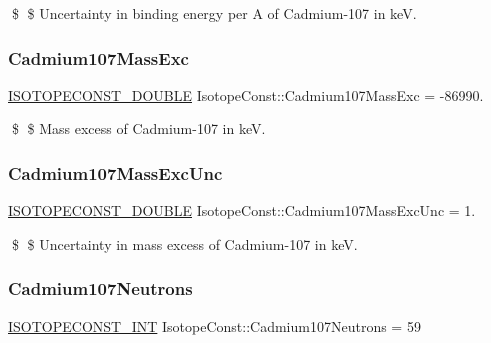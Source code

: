 \$ \$ Uncertainty in binding energy per A of Cadmium-\/107 in keV. \mbox{\label{group___isotope_const-_cadmium-_cd107_ga6fe8e1defdd8b0664dfb27195880ed9b}} 
\subsubsection{\texorpdfstring{Cadmium107\+Mass\+Exc}{Cadmium107MassExc}}
{\footnotesize\ttfamily \mbox{\hyperlink{group___isotope_const-_macros_ga8f45a7272ce02c0b4c65c44636ed719a}{I\+S\+O\+T\+O\+P\+E\+C\+O\+N\+S\+T\+\_\+\+D\+O\+U\+B\+LE}} Isotope\+Const\+::\+Cadmium107\+Mass\+Exc = -\/86990.}

\$ \$ Mass excess of Cadmium-\/107 in keV. \mbox{\label{group___isotope_const-_cadmium-_cd107_gac3fdb6ae37864e73585d9db11727c39a}} 
\subsubsection{\texorpdfstring{Cadmium107\+Mass\+Exc\+Unc}{Cadmium107MassExcUnc}}
{\footnotesize\ttfamily \mbox{\hyperlink{group___isotope_const-_macros_ga8f45a7272ce02c0b4c65c44636ed719a}{I\+S\+O\+T\+O\+P\+E\+C\+O\+N\+S\+T\+\_\+\+D\+O\+U\+B\+LE}} Isotope\+Const\+::\+Cadmium107\+Mass\+Exc\+Unc = 1.}

\$ \$ Uncertainty in mass excess of Cadmium-\/107 in keV. \mbox{\label{group___isotope_const-_cadmium-_cd107_ga3ef2168c2ab4a4386367c4a48f07c79c}} 
\subsubsection{\texorpdfstring{Cadmium107\+Neutrons}{Cadmium107Neutrons}}
{\footnotesize\ttfamily \mbox{\hyperlink{group___isotope_const-_macros_ga5f18360b3e99483a35c32d789e62621c}{I\+S\+O\+T\+O\+P\+E\+C\+O\+N\+S\+T\+\_\+\+I\+NT}} Isotope\+Const\+::\+Cadmium107\+Neutrons = 59}

